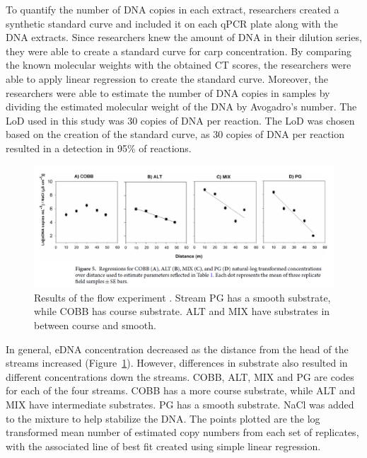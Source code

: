 \vspace{3mm}

 To quantify the number of DNA copies in each extract, researchers created a synthetic standard curve and included it on each qPCR plate along with the DNA extracts. Since researchers knew the amount of DNA in their dilution series, they were able to create a standard curve for carp concentration. By comparing the known molecular weights with the obtained CT scores, the researchers were able to apply linear regression to create the standard curve. Moreover, the researchers were able to estimate the number of DNA copies in samples by dividing the estimated molecular weight of the DNA by Avogadro’s number. The LoD used in this study was 30 copies of DNA per reaction. The LoD was chosen based on the creation of the standard curve, as 30 copies of DNA per reaction resulted in a detection in 95\% of reactions.


\begin{figure}[H]
\includegraphics[scale=0.6]{Chapter2Images/transport2.png}
\caption{Results of the flow experiment \citep{ednatransport}. Stream PG has a smooth substrate, while COBB has course substrate. ALT and MIX have substrates in between course and smooth.}
\label{fig:ednatransport2}
\end{figure}

In general, eDNA concentration decreased as the distance from the head of the streams increased (Figure~\ref{fig:ednatransport2}). However, differences in substrate also resulted in different concentrations down the streams. COBB, ALT, MIX and PG are codes for each of the four streams. COBB has a more course substrate, while ALT and MIX have intermediate substrates. PG has a smooth substrate. NaCl was added to the mixture to help stabilize the DNA. The points plotted are the log transformed mean number of estimated copy numbers from each set of replicates, with the associated line of best fit created using simple linear regression.


